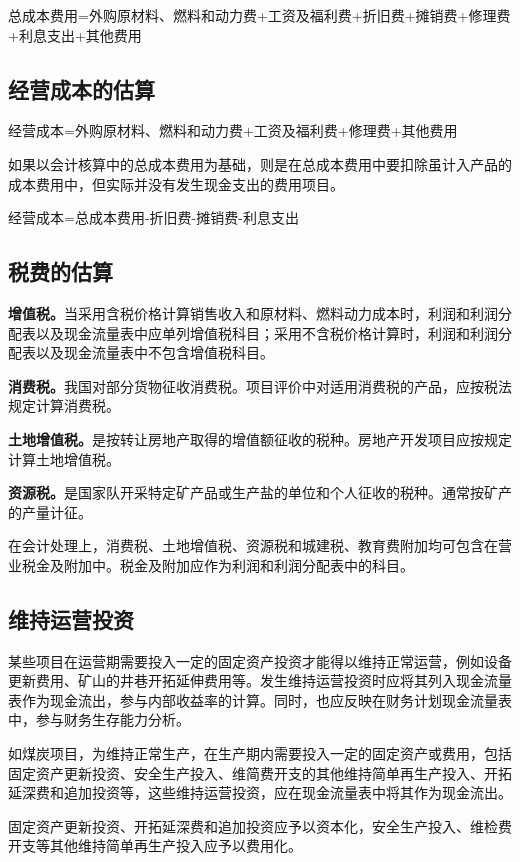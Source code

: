 总成本费用=外购原材料、燃料和动力费+工资及福利费+折旧费+摊销费+修理费+利息支出+其他费用

\subsection{经营成本的估算}

经营成本=外购原材料、燃料和动力费+工资及福利费+修理费+其他费用

如果以会计核算中的总成本费用为基础，则是在总成本费用中要扣除虽计入产品的成本费用中，但实际并没有发生现金支出的费用项目。

经营成本=总成本费用-折旧费-摊销费-利息支出

\subsection{税费的估算}

\textbf{增值税。}当采用含税价格计算销售收入和原材料、燃料动力成本时，利润和利润分配表以及现金流量表中应单列增值税科目；采用不含税价格计算时，利润和利润分配表以及现金流量表中不包含增值税科目。

\textbf{消费税。}我国对部分货物征收消费税。项目评价中对适用消费税的产品，应按税法规定计算消费税。

\textbf{土地增值税。}是按转让房地产取得的增值额征收的税种。房地产开发项目应按规定计算土地增值税。

\textbf{资源税。}是国家队开采特定矿产品或生产盐的单位和个人征收的税种。通常按矿产的产量计征。

在会计处理上，消费税、土地增值税、资源税和城建税、教育费附加均可包含在营业税金及附加中。税金及附加应作为利润和利润分配表中的科目。

\subsection{维持运营投资}

某些项目在运营期需要投入一定的固定资产投资才能得以维持正常运营，例如设备更新费用、矿山的井巷开拓延伸费用等。发生维持运营投资时应将其列入现金流量表作为现金流出，参与内部收益率的计算。同时，也应反映在财务计划现金流量表中，参与财务生存能力分析。

如煤炭项目，为维持正常生产，在生产期内需要投入一定的固定资产或费用，包括固定资产更新投资、安全生产投入、维简费开支的其他维持简单再生产投入、开拓延深费和追加投资等，这些维持运营投资，应在现金流量表中将其作为现金流出。

固定资产更新投资、开拓延深费和追加投资应予以资本化，安全生产投入、维检费开支等其他维持简单再生产投入应予以费用化。

